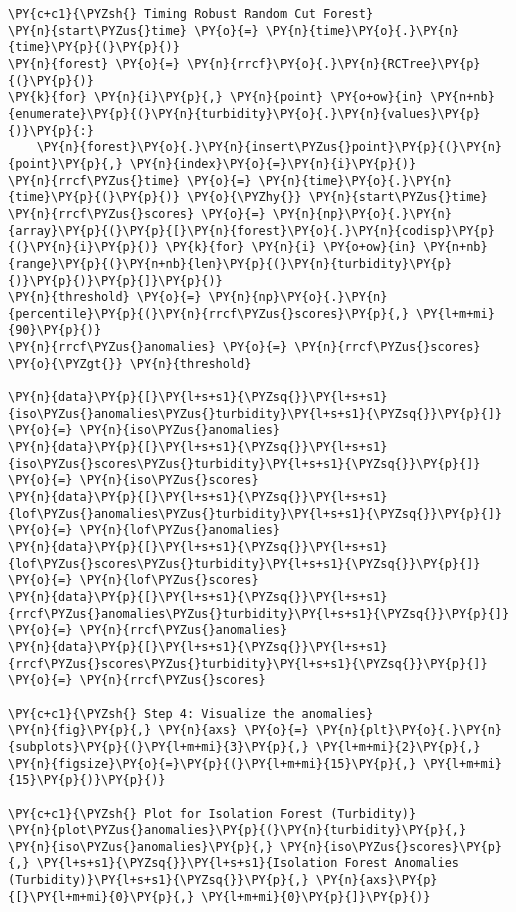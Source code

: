 \begin{tcolorbox}[breakable, size=fbox, boxrule=1pt, pad at break*=1mm,colback=cellbackground, colframe=cellborder]
\begin{Verbatim}[commandchars=\\\{\}]
\PY{c+c1}{\PYZsh{} Timing Robust Random Cut Forest}
\PY{n}{start\PYZus{}time} \PY{o}{=} \PY{n}{time}\PY{o}{.}\PY{n}{time}\PY{p}{(}\PY{p}{)}
\PY{n}{forest} \PY{o}{=} \PY{n}{rrcf}\PY{o}{.}\PY{n}{RCTree}\PY{p}{(}\PY{p}{)}
\PY{k}{for} \PY{n}{i}\PY{p}{,} \PY{n}{point} \PY{o+ow}{in} \PY{n+nb}{enumerate}\PY{p}{(}\PY{n}{turbidity}\PY{o}{.}\PY{n}{values}\PY{p}{)}\PY{p}{:}
    \PY{n}{forest}\PY{o}{.}\PY{n}{insert\PYZus{}point}\PY{p}{(}\PY{n}{point}\PY{p}{,} \PY{n}{index}\PY{o}{=}\PY{n}{i}\PY{p}{)}
\PY{n}{rrcf\PYZus{}time} \PY{o}{=} \PY{n}{time}\PY{o}{.}\PY{n}{time}\PY{p}{(}\PY{p}{)} \PY{o}{\PYZhy{}} \PY{n}{start\PYZus{}time}
\PY{n}{rrcf\PYZus{}scores} \PY{o}{=} \PY{n}{np}\PY{o}{.}\PY{n}{array}\PY{p}{(}\PY{p}{[}\PY{n}{forest}\PY{o}{.}\PY{n}{codisp}\PY{p}{(}\PY{n}{i}\PY{p}{)} \PY{k}{for} \PY{n}{i} \PY{o+ow}{in} \PY{n+nb}{range}\PY{p}{(}\PY{n+nb}{len}\PY{p}{(}\PY{n}{turbidity}\PY{p}{)}\PY{p}{)}\PY{p}{]}\PY{p}{)}
\PY{n}{threshold} \PY{o}{=} \PY{n}{np}\PY{o}{.}\PY{n}{percentile}\PY{p}{(}\PY{n}{rrcf\PYZus{}scores}\PY{p}{,} \PY{l+m+mi}{90}\PY{p}{)}
\PY{n}{rrcf\PYZus{}anomalies} \PY{o}{=} \PY{n}{rrcf\PYZus{}scores} \PY{o}{\PYZgt{}} \PY{n}{threshold}

\PY{n}{data}\PY{p}{[}\PY{l+s+s1}{\PYZsq{}}\PY{l+s+s1}{iso\PYZus{}anomalies\PYZus{}turbidity}\PY{l+s+s1}{\PYZsq{}}\PY{p}{]} \PY{o}{=} \PY{n}{iso\PYZus{}anomalies}
\PY{n}{data}\PY{p}{[}\PY{l+s+s1}{\PYZsq{}}\PY{l+s+s1}{iso\PYZus{}scores\PYZus{}turbidity}\PY{l+s+s1}{\PYZsq{}}\PY{p}{]} \PY{o}{=} \PY{n}{iso\PYZus{}scores}
\PY{n}{data}\PY{p}{[}\PY{l+s+s1}{\PYZsq{}}\PY{l+s+s1}{lof\PYZus{}anomalies\PYZus{}turbidity}\PY{l+s+s1}{\PYZsq{}}\PY{p}{]} \PY{o}{=} \PY{n}{lof\PYZus{}anomalies}
\PY{n}{data}\PY{p}{[}\PY{l+s+s1}{\PYZsq{}}\PY{l+s+s1}{lof\PYZus{}scores\PYZus{}turbidity}\PY{l+s+s1}{\PYZsq{}}\PY{p}{]} \PY{o}{=} \PY{n}{lof\PYZus{}scores}
\PY{n}{data}\PY{p}{[}\PY{l+s+s1}{\PYZsq{}}\PY{l+s+s1}{rrcf\PYZus{}anomalies\PYZus{}turbidity}\PY{l+s+s1}{\PYZsq{}}\PY{p}{]} \PY{o}{=} \PY{n}{rrcf\PYZus{}anomalies}
\PY{n}{data}\PY{p}{[}\PY{l+s+s1}{\PYZsq{}}\PY{l+s+s1}{rrcf\PYZus{}scores\PYZus{}turbidity}\PY{l+s+s1}{\PYZsq{}}\PY{p}{]} \PY{o}{=} \PY{n}{rrcf\PYZus{}scores}

\PY{c+c1}{\PYZsh{} Step 4: Visualize the anomalies}
\PY{n}{fig}\PY{p}{,} \PY{n}{axs} \PY{o}{=} \PY{n}{plt}\PY{o}{.}\PY{n}{subplots}\PY{p}{(}\PY{l+m+mi}{3}\PY{p}{,} \PY{l+m+mi}{2}\PY{p}{,} \PY{n}{figsize}\PY{o}{=}\PY{p}{(}\PY{l+m+mi}{15}\PY{p}{,} \PY{l+m+mi}{15}\PY{p}{)}\PY{p}{)}

\PY{c+c1}{\PYZsh{} Plot for Isolation Forest (Turbidity)}
\PY{n}{plot\PYZus{}anomalies}\PY{p}{(}\PY{n}{turbidity}\PY{p}{,} \PY{n}{iso\PYZus{}anomalies}\PY{p}{,} \PY{n}{iso\PYZus{}scores}\PY{p}{,} \PY{l+s+s1}{\PYZsq{}}\PY{l+s+s1}{Isolation Forest Anomalies (Turbidity)}\PY{l+s+s1}{\PYZsq{}}\PY{p}{,} \PY{n}{axs}\PY{p}{[}\PY{l+m+mi}{0}\PY{p}{,} \PY{l+m+mi}{0}\PY{p}{]}\PY{p}{)}


\end{Verbatim}
\end{tcolorbox}
